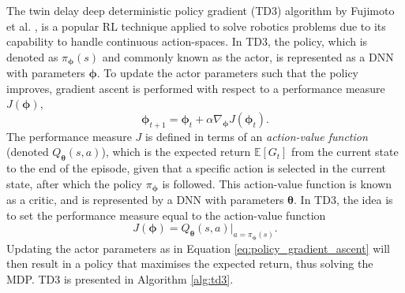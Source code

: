 The twin delay deep deterministic policy gradient (TD3) algorithm by Fujimoto et al. \cite{Fujimoto2018}, is a popular RL technique applied to solve robotics problems due to its capability to handle continuous action-spaces.
In TD3, the policy, which is denoted as $\pi_{\bm{\phi}}(s)$ and commonly known as the actor, is represented as a DNN with parameters $\bm{\phi}$.
To update the actor parameters such that the policy improves, gradient ascent is performed with respect to a performance measure $J(\bm{\phi})$,
\begin{equation}\label{eq:policy_gradient_ascent}
    \bm{\phi}_{t+1} = \bm{\phi}_{t} + \alpha \nabla_{\bm{\phi}} J(\bm{\phi}_t).
\end{equation}
The performance measure $J$ is defined in terms of an \emph{action-value function} (denoted $Q_{\bm{\theta}}(s,a)$), 
which is the expected return $\mathbb{E}[G_t]$ from the current state to the end of the episode, 
given that a specific action is selected in the current state, after which the policy $\pi_{\bm{\phi}}$ is followed.
This action-value function is known as a critic, and is represented by a DNN with parameters $\bm{\theta}$.
In TD3, the idea is to set the performance measure equal to the action-value function
\begin{equation}
    J(\bm{\phi}) = Q_{\bm{\theta}}(s,a)| _{a=\pi_{\bm{\phi}}(s)}.
\end{equation}
Updating the actor parameters as in Equation \ref{eq:policy_gradient_ascent} will then result in a policy that maximises the expected return, thus solving the MDP. 
TD3 is presented in Algorithm \ref{alg:td3}.


